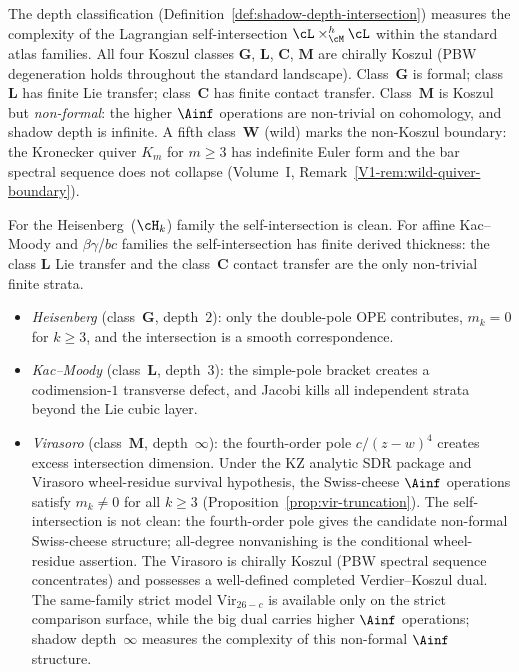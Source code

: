\begin{remark}
\label{rem:koszul-clean-landscape}
The depth classification
(Definition~\ref{def:shadow-depth-intersection})
measures the complexity of the Lagrangian self-intersection
$\cL \times_{\cM}^h \cL$ within the standard atlas families.
All four Koszul classes $\mathbf{G}$, $\mathbf{L}$, $\mathbf{C}$,
$\mathbf{M}$ are chirally Koszul (PBW degeneration holds
throughout the standard landscape). Class~$\mathbf{G}$ is formal;
class~$\mathbf{L}$ has finite Lie transfer; class~$\mathbf{C}$ has
finite contact transfer. Class~$\mathbf{M}$ is Koszul but
\emph{non-formal}: the higher $\Ainf$ operations are non-trivial on
cohomology, and shadow depth is infinite. A fifth class~$\mathbf{W}$
(wild) marks the non-Koszul boundary: the Kronecker quiver
$K_m$ for $m \geq 3$ has indefinite Euler form and the bar
spectral sequence does not collapse
(Volume~I, Remark~\ref*{V1-rem:wild-quiver-boundary}).

For the Heisenberg~($\cH_k$) family the self-intersection is
clean. For affine Kac--Moody and $\beta\gamma$/$bc$ families
the self-intersection has finite derived thickness: the class
$\mathbf{L}$ Lie transfer and the class~$\mathbf{C}$ contact
transfer are the only non-trivial finite strata.
\begin{itemize}[nosep]
\item \emph{Heisenberg} (class~$\mathbf{G}$, depth~$2$):
 only the double-pole OPE contributes, $m_k = 0$ for
 $k \ge 3$, and the intersection is a smooth correspondence.
\item \emph{Kac--Moody} (class~$\mathbf{L}$, depth~$3$):
 the simple-pole bracket creates a codimension-$1$
 transverse defect, and Jacobi kills all independent strata
 beyond the Lie cubic layer.
\item \emph{Virasoro} (class~$\mathbf{M}$, depth~$\infty$):
 the fourth-order pole $c/(z-w)^4$ creates excess
 intersection dimension. Under the KZ analytic SDR package and
 Virasoro wheel-residue survival hypothesis, the Swiss-cheese
 $\Ainf$ operations satisfy $m_k \ne 0$ for all $k \ge 3$
 (Proposition~\ref{prop:vir-truncation}).
 The self-intersection is not clean: the fourth-order pole
 gives the candidate non-formal Swiss-cheese structure; all-degree
 nonvanishing is the conditional wheel-residue assertion.
 The Virasoro is chirally Koszul (PBW spectral sequence
 concentrates) and possesses a well-defined completed
 Verdier--Koszul dual. The same-family strict model
 $\mathrm{Vir}_{26-c}$ is available only on the strict comparison
 surface, while the big dual carries higher $\Ainf$ operations; shadow
 depth~$\infty$ measures the complexity of this
 non-formal $\Ainf$ structure.
\end{itemize}
\end{remark}

